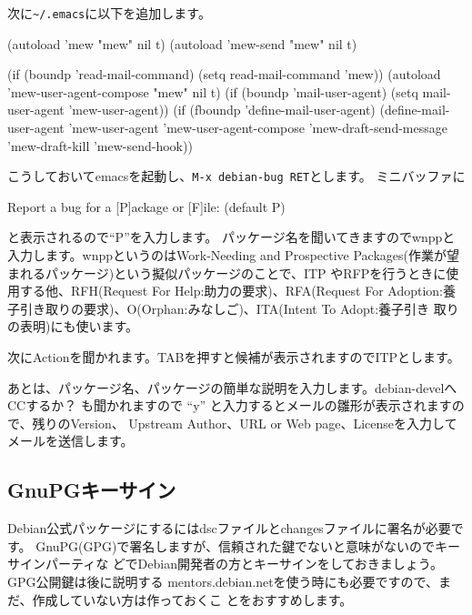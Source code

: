 \documentclass[mingoth,a4paper]{jsarticle}
\begin{document}

次に\texttt{\~{}/.emacs}に以下を追加します。

\begin{commandline}
(autoload 'mew "mew" nil t)
(autoload 'mew-send "mew" nil t)

(if (boundp 'read-mail-command)
	(setq read-mail-command 'mew))
(autoload 'mew-user-agent-compose "mew" nil t)
(if (boundp 'mail-user-agent)
	(setq mail-user-agent 'mew-user-agent))
(if (fboundp 'define-mail-user-agent)
	(define-mail-user-agent
		'mew-user-agent
		'mew-user-agent-compose
		'mew-draft-send-message
		'mew-draft-kill
		'mew-send-hook))
\end{commandline}

こうしておいてemacsを起動し、\texttt{M-x debian-bug RET}とします。
ミニバッファに

\begin{commandline}
Report a bug for a [P]ackage or [F]ile: (default P)
\end{commandline}

と表示されるので``P''を入力します。
パッケージ名を聞いてきますのでwnppと入力します。wnppというのはWork-Needing and
Prospective Packages(作業が望まれるパッケージ)という擬似パッケージのことで、ITP
やRFPを行うときに使用する他、RFH(Request For Help:助力の要求)、RFA(Request For
Adoption:養子引き取りの要求)、O(Orphan:みなしご)、ITA(Intent To Adopt:養子引き
取りの表明)にも使います。

次にActionを聞かれます。TABを押すと候補が表示されますのでITPとします。

あとは、パッケージ名、パッケージの簡単な説明を入力します。debian-develへCCするか？
も聞かれますので ``y'' と入力するとメールの雛形が表示されますので、残りのVersion、
Upstream Author、URL or Web page、Licenseを入力してメールを送信します。

\subsection{GnuPGキーサイン}
Debian公式パッケージにするにはdscファイルとchangesファイルに署名が必要です。
GnuPG(GPG)で署名しますが、信頼された鍵でないと意味がないのでキーサインパーティな
どでDebian開発者の方とキーサインをしておきましょう。GPG公開鍵は後に説明する
mentors.debian.netを使う時にも必要ですので、まだ、作成していない方は作っておくこ
とをおすすめします。
\end{document}
